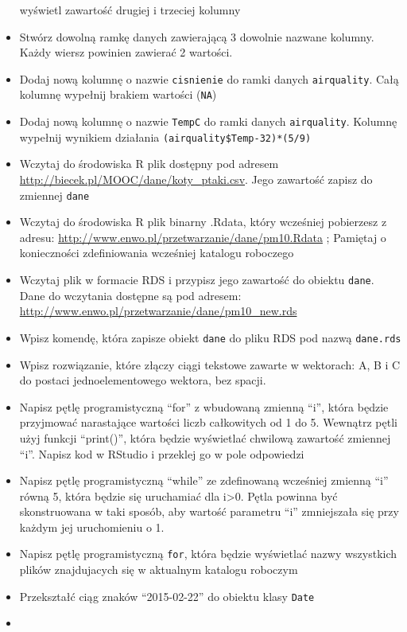 \documentclass[]{book}
\theoremstyle{definition}
\theoremstyle{definition}
\theoremstyle{definition}
\theoremstyle{remark}
\begin{document}
\begin{itemize}
  wyświetl zawartość drugiej i trzeciej kolumny
\item
  Stwórz dowolną ramkę danych zawierającą 3 dowolnie nazwane kolumny.
  Każdy wiersz powinien zawierać 2 wartości.
\item
  Dodaj nową kolumnę o nazwie \texttt{cisnienie} do ramki danych
  \texttt{airquality}. Całą kolumnę wypełnij brakiem wartości
  (\texttt{NA})
\item
  Dodaj nową kolumnę o nazwie \texttt{TempC} do ramki danych
  \texttt{airquality}. Kolumnę wypełnij wynikiem działania
  \texttt{(airquality\$Temp-32)*(5/9)}
\item
  Wczytaj do środowiska R plik dostępny pod adresem
  \url{http://biecek.pl/MOOC/dane/koty_ptaki.csv}. Jego zawartość zapisz
  do zmiennej \texttt{dane}
\item
  Wczytaj do środowiska R plik binarny .Rdata, który wcześniej
  pobierzesz z adresu:
  \url{http://www.enwo.pl/przetwarzanie/dane/pm10.Rdata} ; Pamiętaj o
  konieczności zdefiniowania wcześniej katalogu roboczego
\item
  Wczytaj plik w formacie RDS i przypisz jego zawartość do obiektu
  \texttt{dane}. Dane do wczytania dostępne są pod adresem:
  \url{http://www.enwo.pl/przetwarzanie/dane/pm10_new.rds}
\item
  Wpisz komendę, która zapisze obiekt \texttt{dane} do pliku RDS pod
  nazwą \texttt{dane.rds}
\item
  Wpisz rozwiązanie, które złączy ciągi tekstowe zawarte w wektorach: A,
  B i C do postaci jednoelementowego wektora, bez spacji.
\item
  Napisz pętlę programistyczną ``for'' z wbudowaną zmienną ``i'', która
  będzie przyjmować narastające wartości liczb całkowitych od 1 do 5.
  Wewnątrz pętli użyj funkcji ``print()'', która będzie wyświetlać
  chwilową zawartość zmiennej ``i''. Napisz kod w RStudio i przeklej go
  w pole odpowiedzi
\item
  Napisz pętlę programistyczną ``while'' ze zdefinowaną wcześniej
  zmienną ``i'' równą 5, która będzie się uruchamiać dla
  i\textgreater{}0. Pętla powinna być skonstruowana w taki sposób, aby
  wartość parametru ``i'' zmniejszała się przy każdym jej uruchomieniu o
  1.
\item
  Napisz pętlę programistyczną \texttt{for}, która będzie wyświetlać
  nazwy wszystkich plików znajdujacych się w aktualnym katalogu roboczym
\item
  Przekształć ciąg znaków ``2015-02-22'' do obiektu klasy \texttt{Date}
\item

\end{itemize}
\end{document}
